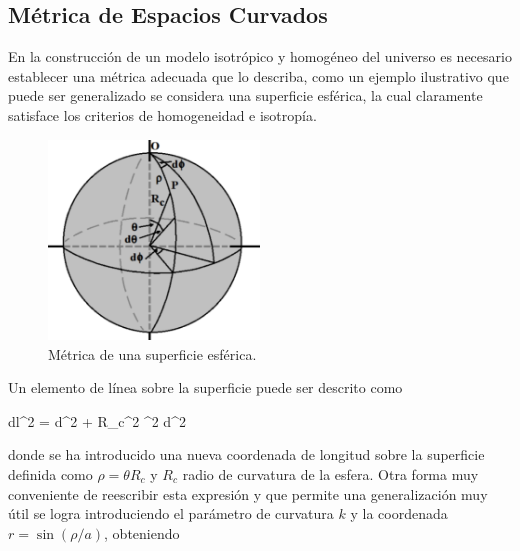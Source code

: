 	\subsection{Métrica de Espacios Curvados}
	\label{subsec:MetricOFCurvedSpaces}
	

En la construcción de un modelo isotrópico y homogéneo del universo es
necesario establecer una métrica adecuada que lo describa, como un ejemplo
ilustrativo que puede ser generalizado se considera una superficie esférica, 
la cual claramente satisface los criterios de homogeneidad e isotropía.


\begin{figure}[htbp]
	\centering
	\includegraphics[width=0.5\textwidth]{./figures/2_theoretical_framework/2D_Sphere.png}
	
	\caption{\small{Métrica de una superficie esférica.}}
	
	\label{fig:HerschelModel}
\end{figure}



Un elemento de línea sobre la superficie puede ser descrito como


{ dl^2 = d\rho^2 + R_c^2 \sin^2 d\phi^2 }


donde se ha introducido una nueva coordenada de longitud sobre la superficie
definida como $\rho = \theta R_c$ y $R_c$ radio de curvatura de la esfera. 
Otra forma muy conveniente de reescribir esta expresión y que permite una
generalización muy útil se logra introduciendo el parámetro de curvatura $k$ 
y la coordenada $r = \sin (\rho/a)$, obteniendo


